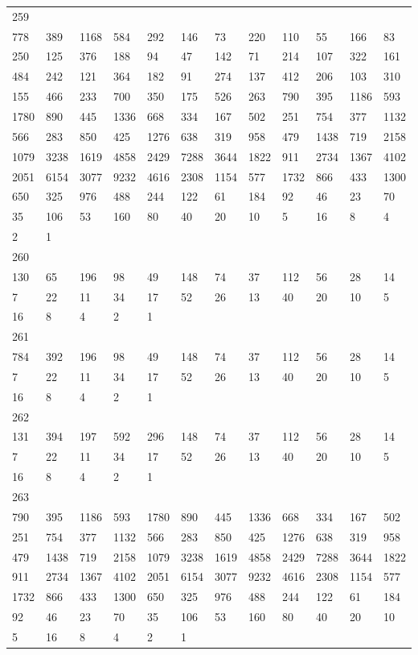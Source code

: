 \begin{longtable}{llllllllllll}
259&&&&&&&&&&&\\
778& 389& 1168& 584& 292& 146& 73& 220& 110& 55& 166& 83\\
250& 125& 376& 188& 94& 47& 142& 71& 214& 107& 322& 161\\
484& 242& 121& 364& 182& 91& 274& 137& 412& 206& 103& 310\\
155& 466& 233& 700& 350& 175& 526& 263& 790& 395& 1186& 593\\
1780& 890& 445& 1336& 668& 334& 167& 502& 251& 754& 377& 1132\\
566& 283& 850& 425& 1276& 638& 319& 958& 479& 1438& 719& 2158\\
1079& 3238& 1619& 4858& 2429& 7288& 3644& 1822& 911& 2734& 1367& 4102\\
2051& 6154& 3077& 9232& 4616& 2308& 1154& 577& 1732& 866& 433& 1300\\
650& 325& 976& 488& 244& 122& 61& 184& 92& 46& 23& 70\\
35& 106& 53& 160& 80& 40& 20& 10& 5& 16& 8& 4\\
2& 1& \\

260&&&&&&&&&&&\\
130& 65& 196& 98& 49& 148& 74& 37& 112& 56& 28& 14\\
7& 22& 11& 34& 17& 52& 26& 13& 40& 20& 10& 5\\
16& 8& 4& 2& 1& \\

261&&&&&&&&&&&\\
784& 392& 196& 98& 49& 148& 74& 37& 112& 56& 28& 14\\
7& 22& 11& 34& 17& 52& 26& 13& 40& 20& 10& 5\\
16& 8& 4& 2& 1& \\

262&&&&&&&&&&&\\
131& 394& 197& 592& 296& 148& 74& 37& 112& 56& 28& 14\\
7& 22& 11& 34& 17& 52& 26& 13& 40& 20& 10& 5\\
16& 8& 4& 2& 1& \\

263&&&&&&&&&&&\\
790& 395& 1186& 593& 1780& 890& 445& 1336& 668& 334& 167& 502\\
251& 754& 377& 1132& 566& 283& 850& 425& 1276& 638& 319& 958\\
479& 1438& 719& 2158& 1079& 3238& 1619& 4858& 2429& 7288& 3644& 1822\\
911& 2734& 1367& 4102& 2051& 6154& 3077& 9232& 4616& 2308& 1154& 577\\
1732& 866& 433& 1300& 650& 325& 976& 488& 244& 122& 61& 184\\
92& 46& 23& 70& 35& 106& 53& 160& 80& 40& 20& 10\\
5& 16& 8& 4& 2& 1& \\


\end{longtable}
